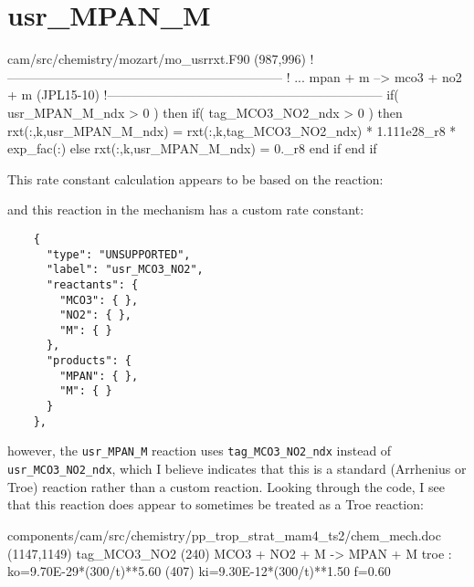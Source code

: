 \documentclass[titlepage]{article}
\begin{document}

\section{usr\_MPAN\_M}

\begin{blockcode}[commandchars=\\\{\}]
\color{gray}cam/src/chemistry/mozart/mo_usrrxt.F90 (987,996)
!-----------------------------------------------------------------
! ... mpan + m --> mco3 + no2 + m (JPL15-10)
!-----------------------------------------------------------------
       if( usr_MPAN_M_ndx > 0 ) then
          if( tag_MCO3_NO2_ndx > 0 ) then
             rxt(:,k,usr_MPAN_M_ndx) = rxt(:,k,tag_MCO3_NO2_ndx) * 1.111e28_r8 * exp_fac(:)
          else
             rxt(:,k,usr_MPAN_M_ndx) = 0._r8
          end if
       end if
\end{blockcode}

This rate constant calculation appears to be based on the reaction:
\vspace{20px}


\vspace{20px}
\noindent and this reaction in the mechanism has a custom rate constant:

\begin{verbatim}
    {
      "type": "UNSUPPORTED",
      "label": "usr_MCO3_NO2",
      "reactants": {
        "MCO3": { },
        "NO2": { },
        "M": { }
      },
      "products": {
        "MPAN": { },
        "M": { }
      }
    },
\end{verbatim}

\noindent however, the \verb>usr_MPAN_M> reaction uses \verb>tag_MCO3_NO2_ndx> instead of \verb>usr_MCO3_NO2_ndx>, which I believe indicates that this is a standard (Arrhenius or Troe) reaction rather than a custom reaction. Looking through the code, I see that this reaction does appear to sometimes be treated as a Troe reaction:

\begin{blockcode}[commandchars=\\\{\}]
\color{gray}components/cam/src/chemistry/pp_trop_strat_mam4_ts2/chem_mech.doc (1147,1149)
  tag_MCO3_NO2     (240)   MCO3 + NO2 + M ->  MPAN + M                                          troe : ko=9.70E-29*(300/t)**5.60  (407)
                                                                                                       ki=9.30E-12*(300/t)**1.50
                                                                                                        f=0.60
\end{blockcode}
\end{document}
